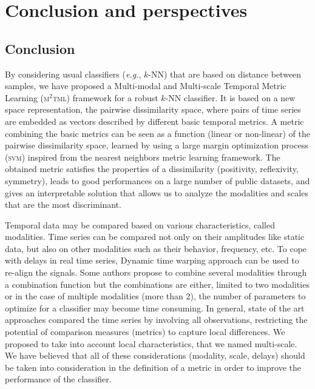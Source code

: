 \chapter*{Conclusion and perspectives}
\label{sec:conclusion}

\section*{Conclusion}
By considering usual classifiers (\textit{e.g.}, $k$-NN) that are based on distance between samples, we have proposed a Multi-modal and Multi-scale Temporal Metric Learning (\textsc{m$^2$tml}) framework for a robust $k$-NN classifier. It is based on a new space representation, the pairwise dissimilarity space, where pairs of time series are embedded as vectors described by different basic temporal metrics. A metric combining the basic metrics can be seen as a function (linear or non-linear) of the pairwise dissimilarity space, learned by using a large margin optimization process (\textsc{svm}) inspired from the nearest neighbors metric learning framework. The obtained metric satisfies the properties of a dissimilarity (positivity, reflexivity, symmetry), leads to good performances on a large number of public datasets, and gives an interpretable solution that allows us to analyze the modalities and scales that are the most discriminant.

Temporal data may be compared based on various characteristics, called modalities. Time series can be compared not only on their amplitudes like static data, but also on other modalities such as their behavior, frequency, etc. To cope with delays in real time series, Dynamic time warping approach can be used to re-align the signals.  Some authors propose to combine several modalities through a combination function but the combinations are either, limited to two modalities or in the case of multiple modalities (more than 2), the number of parameters to optimize for a classifier may become time consuming. In general, state of the art approaches compared the time series by involving all observations, restricting the potential of comparison measures (metrics) to capture local differences. We proposed to take into account local characteristics, that we named multi-scale. We have believed that all of these considerations (modality, scale, delays) should be taken into consideration in the definition of a metric in order to improve the performance of the classifier.

